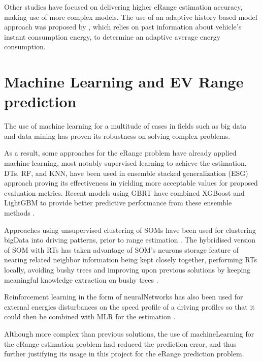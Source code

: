 Other studies have focused on delivering 
higher \gls{eRange} estimation accuracy,
making use of more complex models. 
The use of an adaptive history based model 
approach was proposed by \citep{classicEVX},
which relies on past information about
vehicle's instant consumption energy, to determine an
adaptive average energy consumption.

\section{Machine Learning and EV Range prediction}
\label{sec:stateOfArtML}

The use of machine learning for a multitude
of cases \citep{machineLearningCaseStudy} in fields such as 
big data \citep{machineLearningBigData, machineLearningBigData2}
and data mining \citep{businessDataMining} has 
proven its robustness on solving complex problems.


As a result, some approaches for the \gls{eRange}
problem have already applied machine learning,
most notably supervised learning to achieve the estimation.
\Glspl{DT}, \gls{RF}, and \gls{KNN}, have been 
used in ensemble stacked generalization (ESG) approach 
\citep{eRangeMachineLearningEnsemble} proving its 
effectiveness in yielding more acceptable values
for proposed evaluation metrics.
Recent models using \gls{GBRT} have
combined \gls{XGBoost} and \gls{LightGBM} 
to provide better predictive performance
from these ensemble methods 
\citep{machineLearningERangeGradientBoostRts}.

Approaches using unsupervised clustering 
of \glspl{SOM} have been used for clustering \gls{bigData} 
into driving patterns, prior to range estimation 
\citep{eRangeMachineLearningGHSOM}.
The hybridised version of \gls{SOM} with \glspl{RT} 
has taken advantage of \gls{SOM}'s neurons storage 
feature of nearing related neighbor information
being kept closely together, performing \glspl{RT}
locally, avoiding bushy trees and improving
upon previous solutions by keeping meaningful
knowledge extraction on bushy trees
\citep{machineLearningERangeSOMandRts}.

Reinforcement learning in the form of \gls{neuralNetworks}
has also been used for external energies 
disturbances on the speed profile of a driving profiles 
so that it could then be combined with \gls{MLR} 
for the estimation \citep{eRangeMachineLearningNeuralnetworkMLR}.

Although more complex than previous solutions, 
the use of \gls{machineLearning} for the 
\gls{eRange} estimation problem had reduced 
the prediction error, and thus further justifying
its usage in this project for the \gls{eRange}
prediction problem.